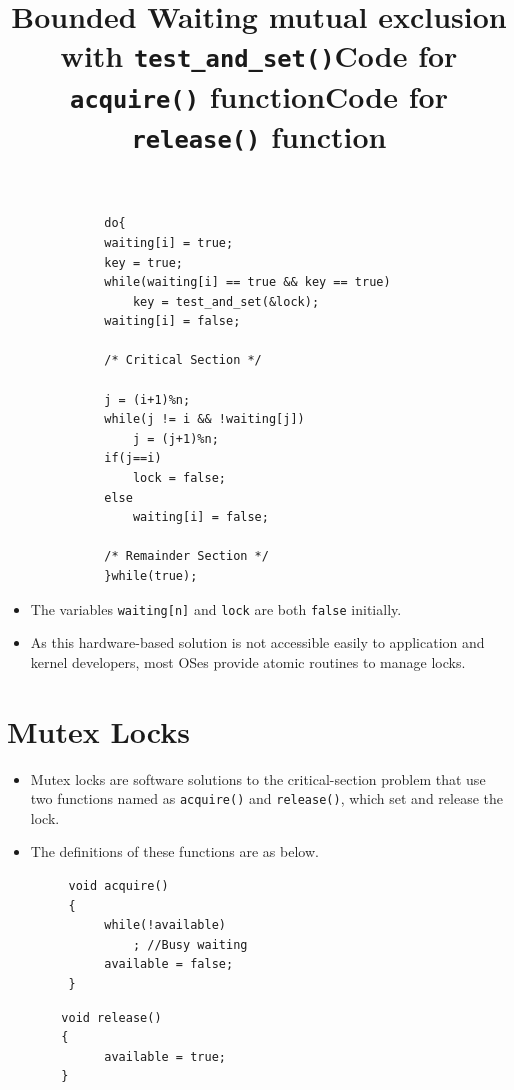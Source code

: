 \documentclass{article}
\theoremstyle{plain}
\theoremstyle{definition}
\begin{document}
\begin{figure}[!ht]
    \centering
    \begin{verbatim}
        do{
        waiting[i] = true;
        key = true;
        while(waiting[i] == true && key == true)
            key = test_and_set(&lock);
        waiting[i] = false;
        
        /* Critical Section */
        
        j = (i+1)%n;
        while(j != i && !waiting[j])
            j = (j+1)%n;
        if(j==i)
            lock = false;
        else
            waiting[i] = false;
        
        /* Remainder Section */
        }while(true);
    \end{verbatim}
    \title{Bounded Waiting mutual exclusion with \texttt{test\_and\_set()}}
\end{figure}

\begin{itemize}
    \item The variables \texttt{waiting[n]} and \texttt{lock} are both \texttt{false} initially. 
    
    \item As this hardware-based solution is not accessible easily to application and kernel developers, most OSes provide atomic routines to manage locks.
\end{itemize}

\section{Mutex Locks}
\begin{itemize}
    \item Mutex locks are software solutions to the critical-section problem that use two functions named as \texttt{acquire()} and \texttt{release()}, which set and release the lock.
    
    \item The definitions of these functions are as below.
\end{itemize}

\begin{figure}[!ht]
 \begin{minipage}{0.5\textwidth}
  \centering
  \begin{verbatim}
   void acquire()
   {
        while(!available)
            ; //Busy waiting
        available = false;
   }
  \end{verbatim}
  \title{Code for \texttt{acquire()} function}
 \end{minipage}
 \begin{minipage}{0.5\textwidth}
  \centering
  \begin{verbatim}
  void release()
  {
        available = true;
  }
  \end{verbatim}
  \title{Code for \texttt{release()} function}
 \end{minipage}
\end{figure}
\end{document}
